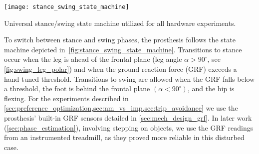 \begin{marginfigure}
    \centering
    \texttt{[image: stance\_swing\_state\_machine]}
    \caption[Universal stance/swing state machine]{Universal stance/swing state
    machine utilized for all hardware
    experiments.}\label{fig:stance_swing_state_machine}
\end{marginfigure} 
To switch between stance and swing phases, the prosthesis follows the state
machine depicted in~\cref{fig:stance_swing_state_machine}.  Transitions to
stance occur when the leg is ahead of the frontal plane (leg angle $\alpha >
90^\circ$, see \cref{fig:swing_leg_polar}) and when the ground reaction force
(GRF) exceeds a hand-tuned threshold. Transitions to swing are allowed when the
GRF falls below a threshold, the foot is behind the frontal plane $(\alpha <
90^\circ)$, and the hip is flexing. For the experiments described in
\cref{sec:preference_optimization,sec:nm_vs_imp,sec:trip_avoidance} we use the
prosthesis' built-in GRF sensors detailed in \cref{sec:mech_design_grf}. In
later work (\cref{sec:phase_estimation}), involving stepping on objects, we use
the GRF readings from an instrumented treadmill, as they proved more reliable in
this disturbed case.
